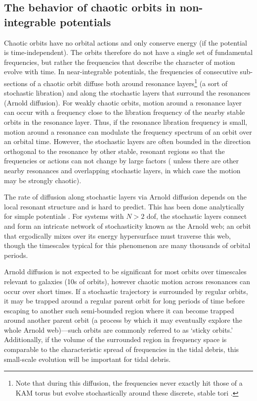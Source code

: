 \documentclass[letterpaper,12pt,preprint]{aastex}
\newcommand{\chchchanges}[1]{{\color{red} {#1}}}
\begin{document}
\subsection{The behavior of chaotic orbits in non-integrable potentials}\label{sec:behavior-chaotic}

Chaotic orbits have no orbital actions and only conserve energy (if the potential is time-independent). The orbits therefore do not have a single set of fundamental frequencies, \chchchanges{but rather the frequencies that describe the character of motion evolve with time.} In near-integrable potentials, \chchchanges{the frequencies of consecutive sub-sections of a chaotic orbit diffuse both around resonance layers\footnote{Note that during this diffusion, the frequencies never exactly hit those of a KAM torus but evolve stochastically around these discrete, stable tori \citep[cf. Figure 2 in][]{laskar99}.} (a sort of stochastic libration) and along the stochastic layers that surround the resonances (Arnold diffusion).} For weakly chaotic orbits, motion \chchchanges{around} a resonance layer can occur with a frequency close to the libration frequency of the nearby stable orbits in the resonance layer. Thus, if the resonance libration frequency is small, motion \chchchanges{around} a resonance can modulate the frequency spectrum of an orbit over an orbital time. However, the stochastic layers are often bounded in the direction orthogonal to the resonance by other stable, resonant regions so that the frequencies or actions can not change by large factors (\chchchanges{unless there are other nearby resonances and overlapping stochastic layers, in which case the motion may be strongly chaotic}). 

The rate of diffusion along stochastic layers via Arnold diffusion depends on the local resonant structure and is hard to predict. This has been done analytically for simple potentials \citep[e.g.,][]{chirikov79}. For systems with $N>2$ dof, the stochastic layers connect and form an intricate network of stochasticity known as the Arnold web; an orbit that ergodically mixes over its energy hypersurface must traverse this web, though the timescales typical for this phenomenon are many thousands of orbital periods. 

Arnold diffusion is not expected to be significant for most orbits over timescales relevant to galaxies (10s of orbits), however chaotic motion across resonances can occur over short times. \chchchanges{If a stochastic trajectory is surrounded by regular orbits, it may be trapped around a regular parent orbit for long periods of time before escaping to another such semi-bounded region where it can become trapped around another parent orbit (a process by which it may eventually explore the whole Arnold web)---such orbits are commonly referred to as `sticky orbits.' Additionally, if the volume of the surrounded region in frequency space is comparable to the characteristic spread of frequencies in the tidal debris, this small-scale evolution will be important for tidal debris.}
\end{document}
